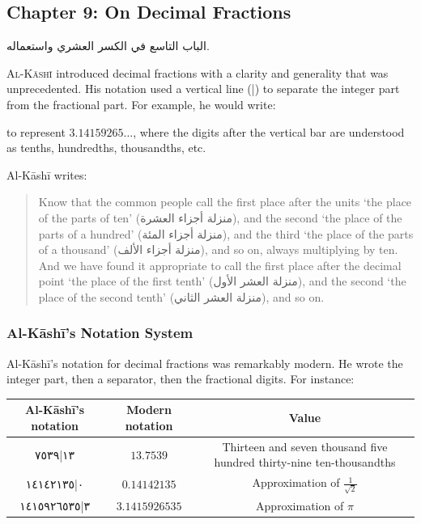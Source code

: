 \documentclass[11pt,a4paper]{article}
\newenvironment{arabicbox}{%
  \begin{framed}
  \begin{minipage}{\linewidth-2\fboxsep-2\fboxrule}
  \setlength{\parindent}{0pt}
  \linespread{1.3}\selectfont
}{%
  \end{minipage}
  \end{framed}
}
\newcommand{\ar}[1]{{\arabicfont\beginR #1\endR}}
\begin{document}
\subsection{Chapter 9: On Decimal Fractions}

\begin{arabicbox}
\begin{Arabic}
الباب التاسع في الكسر العشري واستعماله.
\end{Arabic}
\end{arabicbox}

\vspace{0.3cm}

\lettrine[lines=3, nindent=0em, findent=3pt]{\color{chapcolor}A}{l-K\=ash\=i}
introduced decimal fractions with a clarity and generality that was
unprecedented. His notation used a vertical line (\ar{|}) to separate
the integer part from the fractional part. For example, he would write:

\begin{center}
\end{center}

\noindent to represent $3.14159265\ldots$, where the digits after the
vertical bar are understood as tenths, hundredths, thousandths, etc.

Al-K\=ash\=i writes:

\begin{quote}
Know that the common people call the first place after the units `the
place of the parts of ten' (\ar{منزلة أجزاء العشرة}), and the second
`the place of the parts of a hundred' (\ar{منزلة أجزاء المئة}), and
the third `the place of the parts of a thousand'
(\ar{منزلة أجزاء الألف}), and so on, always multiplying by ten. And
we have found it appropriate to call the first place after the decimal
point `the place of the first tenth' (\ar{منزلة العشر الأول}), and
the second `the place of the second tenth'
(\ar{منزلة العشر الثاني}), and so on.
\end{quote}

\subsubsection{Al-K\=ash\=i's Notation System}

Al-K\=ash\=i's notation for decimal fractions was remarkably modern. He
wrote the integer part, then a separator, then the fractional digits.
For instance:

\begin{center}
\begin{tabular}{|c|c|c|}
\hline
\textbf{Al-K\=ash\=i's notation} & \textbf{Modern notation} & \textbf{Value} \\
\hline
\ar{١٣|٧٥٣٩} & $13.7539$ & Thirteen and seven thousand five
hundred thirty-nine ten-thousandths \\
\hline
\ar{٠|١٤١٤٢١٣٥} & $0.14142135$ & Approximation of
$\frac{1}{\sqrt{2}}$ \\
\hline
\ar{٣|١٤١٥٩٢٦٥٣٥} & $3.1415926535$ & Approximation of $\pi$ \\
\hline
\end{tabular}
\end{center}
\end{document}
